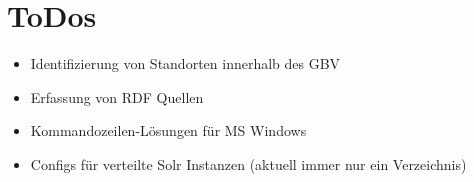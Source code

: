 \documentclass[10pt]{article}
\begin{document}
\section{ToDos}
\begin{itemize}
	\item Identifizierung von Standorten innerhalb des GBV
	\item Erfassung von RDF Quellen
	\item Kommandozeilen-Lösungen für MS Windows
	\item Configs für verteilte Solr Instanzen (aktuell immer nur ein Verzeichnis)
\end{itemize}
\newpage

\pagestyle{empty}

%
%
%

\end{document}
